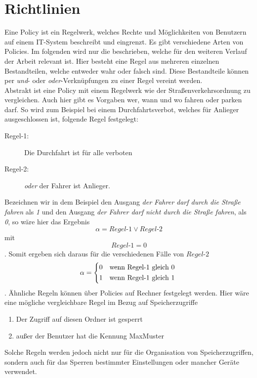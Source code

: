 \chapter{Richtlinien} \label{Policies}
Eine Policy ist ein Regelwerk, welches Rechte und Möglichkeiten von Benutzern auf einem IT-System beschreibt und eingrenzt. Es gibt verschiedene Arten von Policies. Im folgenden wird nur die beschrieben, welche für den weiteren Verlauf der Arbeit relevant ist. Hier besteht eine Regel aus mehreren einzelnen Bestandteilen, welche entweder wahr oder falsch sind. Diese Bestandteile können per \textit{und}- oder \textit{oder}-Verknüpfungen zu einer Regel vereint werden.\\
Abstrakt ist eine Policy mit einem Regelwerk wie der Straßenverkehrsordnung zu vergleichen. Auch hier gibt es Vorgaben wer, wann und wo fahren oder parken darf. So wird zum Beispiel bei einem Durchfahrtsverbot, welches für Anlieger ausgeschlossen ist, folgende Regel festgelegt:
\begin{description}
	\item[Regel-1: ] Die Durchfahrt ist für alle verboten
	\item[Regel-2: ] \textit{oder} der Fahrer ist Anlieger.
\end{description}
Bezeichnen wir in dem Beispiel den Ausgang \textit{der Fahrer darf durch die Straße fahren} als \textit{1} und den Ausgang \textit{der Fahrer darf nicht durch die Straße fahren}, als \textit{0}, so wäre hier das Ergebnis
\begin{equation*}
	\alpha = Regel\text{-}1 \vee Regel\text{-}2
\end{equation*} mit 
\begin{equation*}
	Regel\text{-}1=0
\end{equation*}. Somit ergeben sich daraus für die verschiedenen Fälle von $Regel$-$2$
\[
	\alpha = 
		\begin{dcases*}
			0 & wenn Regel\text{-}1 gleich 0\\
			1 & wenn Regel\text{-}1 gleich 1
		\end{dcases*}
\]
. Ähnliche Regeln können über Policies auf Rechner festgelegt werden. Hier wäre eine mögliche vergleichbare Regel im Bezug auf Speicherzugriffe
\begin{enumerate}
	\item Der Zugriff auf diesen Ordner ist gesperrt
	\item außer der Benutzer hat die Kennung MaxMuster
\end{enumerate}
Solche Regeln werden jedoch nicht nur für die Organisation von Speicherzugriffen, sondern auch für das Sperren bestimmter Einstellungen oder mancher Geräte verwendet.